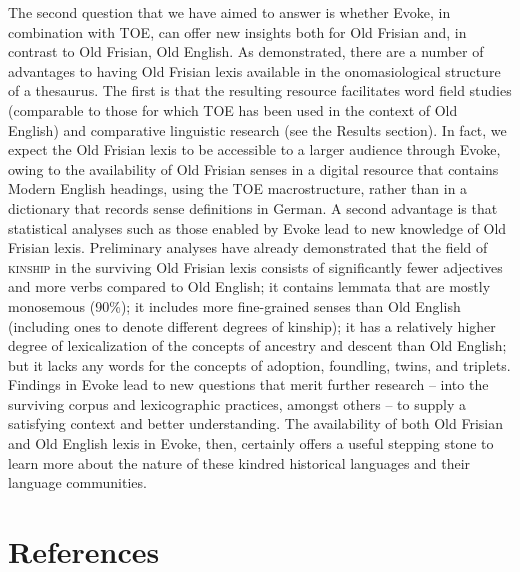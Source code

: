 The second question that we have aimed to answer is whether Evoke, in combination with TOE, can offer new insights both for Old Frisian and, in contrast to Old Frisian, Old English. As demonstrated, there are a number of advantages to having Old Frisian lexis available in the onomasiological structure of a thesaurus. The first is that the resulting resource facilitates word field studies (comparable to those for which TOE has been used in the context of Old English) and comparative linguistic research (see the Results section). In fact, we expect the Old Frisian lexis to be accessible to a larger audience through Evoke, owing to the availability of Old Frisian senses in a digital resource that contains Modern English headings, using the TOE macrostructure, rather than in a dictionary that records sense definitions in German. A second advantage is that statistical analyses such as those enabled by Evoke lead to new knowledge of Old Frisian lexis. Preliminary analyses have already demonstrated that the field of \textsc{kinship} in the surviving Old Frisian lexis consists of significantly fewer adjectives and more verbs compared to Old English; it contains lemmata that are mostly monosemous (90\%); it includes more fine-grained senses than Old English (including ones to denote different degrees of kinship); it has a relatively higher degree of lexicalization of the concepts of ancestry and descent than Old English; but it lacks any words for the concepts of adoption, foundling, twins, and triplets. Findings in Evoke lead to new questions that merit further research – into the surviving corpus and lexicographic practices, amongst others – to supply a satisfying context and better understanding. The availability of both Old Frisian and Old English lexis in Evoke, then, certainly offers a useful stepping stone to learn more about the nature of these kindred historical languages and their language communities.

\section{References}

